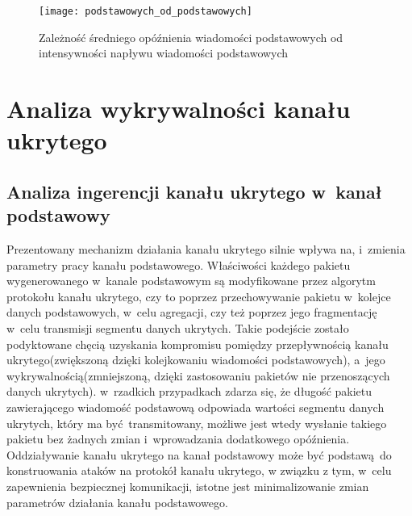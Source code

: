 \documentclass[a4paper, twoside, 12pt]{report}
\begin{document}
        \begin{figure}[h]
                \centering
                \texttt{[image: podstawowych\_od\_podstawowych]}
                \caption{Zależność średniego opóźnienia wiadomości podstawowych od
                    intensywności napływu wiadomości podstawowych}
                \label{OPOZNIENIEPODSTAWOWYCHODPODSTAWOWYCH}
        \end{figure}

\chapter{Analiza wykrywalności kanału ukrytego}
    \section{Analiza ingerencji kanału ukrytego w~kanał podstawowy}
        Prezentowany mechanizm działania kanału ukrytego silnie wpływa na, i~zmienia
        parametry pracy kanału podstawowego. Właściwości każdego pakietu wygenerowanego
        w~kanale podstawowym są modyfikowane przez algorytm protokołu kanału ukrytego,
        czy to poprzez przechowywanie pakietu w~kolejce danych podstawowych, w~celu
        agregacji, czy też
        poprzez jego fragmentację w~celu transmisji segmentu danych ukrytych. Takie podejście
        zostało podyktowane chęcią uzyskania kompromisu pomiędzy przepływnością
        kanału ukrytego(zwiększoną dzięki kolejkowaniu wiadomości podstawowych),
        a~jego wykrywalnością(zmniejszoną, dzięki zastosowaniu pakietów nie przenoszących danych ukrytych).
        w~rzadkich
        przypadkach zdarza się, że długość pakietu zawierającego wiadomość podstawową
        odpowiada wartości segmentu danych ukrytych, który ma być transmitowany,
        możliwe jest wtedy wysłanie takiego pakietu bez żadnych zmian i~wprowadzania
        dodatkowego opóźnienia. Oddziaływanie kanału ukrytego na kanał podstawowy
        może być podstawą do konstruowania ataków na protokół kanału ukrytego, w
        związku z tym, w~celu zapewnienia bezpiecznej komunikacji, istotne jest
        minimalizowanie zmian parametrów działania kanału podstawowego.
\end{document}
